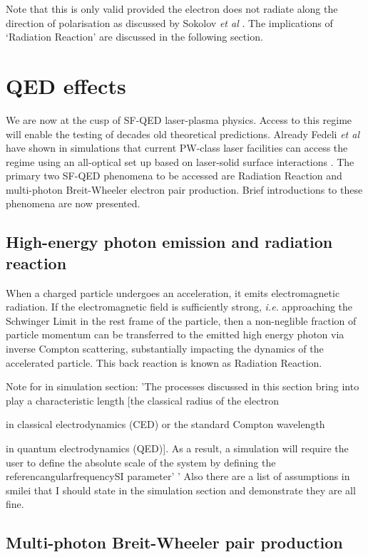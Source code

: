 Note that this is only valid provided the electron does not radiate along the direction of polarisation as discussed by Sokolov \textit{et al} \cite{sokolovDynamicsEmittingElectrons2009}. The implications of `Radiation Reaction' are discussed in the following section.

\section{QED effects}
We are now at the cusp of \ac{SF-QED} laser-plasma physics. Access to this regime will enable the testing of decades old theoretical predictions. Already Fedeli \textit{et al} have shown in simulations that current PW-class laser facilities can access the regime using an all-optical set up based on laser-solid surface interactions \cite{fedeli_2020_ProbingStrongfieldQED}. The primary two SF-QED phenomena to be accessed are Radiation Reaction and multi-photon Breit-Wheeler electron pair production. Brief introductions to these phenomena are now presented.


\subsection{High-energy photon emission and radiation reaction}
When a charged particle undergoes an acceleration, it emits electromagnetic radiation. If the electromagnetic field is sufficiently strong, \textit{i.e.} approaching the Schwinger Limit in the rest frame of the particle, then a non-neglible fraction of particle momentum can be transferred to the emitted high energy photon via inverse Compton scattering, substantially impacting the dynamics of the accelerated particle. This back reaction is known as Radiation Reaction.



Note for in simulation section: 'The processes discussed in this section bring into play a characteristic length [the classical radius of the electron 

in classical electrodynamics (CED) or the standard Compton wavelength 

in quantum electrodynamics (QED)]. As a result, a simulation will require the user to define the absolute scale of the system by defining the referencangularfrequencySI parameter' '
Also there are a list of assumptions in smilei that I should state in the simulation section and demonstrate they are all fine.

\subsection{Multi-photon Breit-Wheeler pair production}

